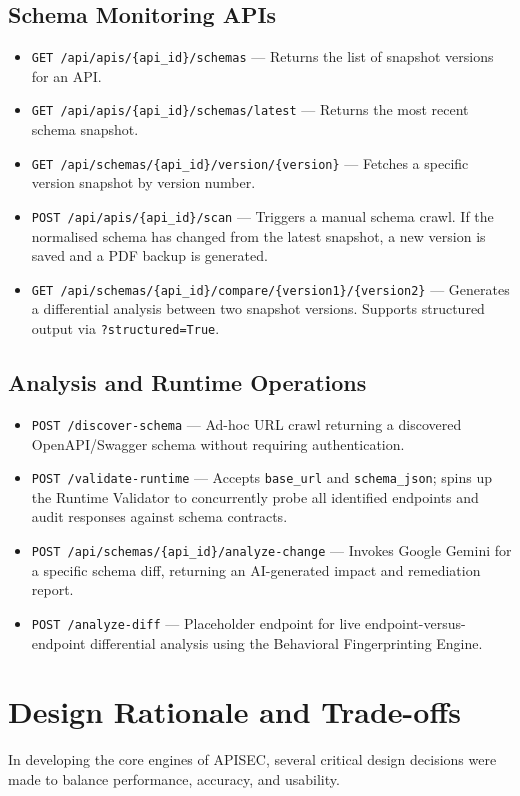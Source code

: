 \documentclass{fisatprojectfinal}
\begin{document}
\subsection{Schema Monitoring APIs}
\begin{itemize}
    \item \texttt{GET /api/apis/\{api\_id\}/schemas} --- Returns the list of snapshot versions for an API.
    \item \texttt{GET /api/apis/\{api\_id\}/schemas/latest} --- Returns the most recent schema snapshot.
    \item \texttt{GET /api/schemas/\{api\_id\}/version/\{version\}} --- Fetches a specific version snapshot by version number.
    \item \texttt{POST /api/apis/\{api\_id\}/scan} --- Triggers a manual schema crawl. If the normalised schema has changed from the latest snapshot, a new version is saved and a PDF backup is generated.
    \item \texttt{GET /api/schemas/\{api\_id\}/compare/\{version1\}/\{version2\}} --- Generates a differential analysis between two snapshot versions. Supports structured output via \texttt{?structured=True}.
\end{itemize}

\subsection{Analysis and Runtime Operations}
\begin{itemize}
    \item \texttt{POST /discover-schema} --- Ad-hoc URL crawl returning a discovered OpenAPI/Swagger schema without requiring authentication.
    \item \texttt{POST /validate-runtime} --- Accepts \texttt{base\_url} and \texttt{schema\_json}; spins up the Runtime Validator to concurrently probe all identified endpoints and audit responses against schema contracts.
    \item \texttt{POST /api/schemas/\{api\_id\}/analyze-change} --- Invokes Google Gemini for a specific schema diff, returning an AI-generated impact and remediation report.
    \item \texttt{POST /analyze-diff} --- Placeholder endpoint for live endpoint-versus-endpoint differential analysis using the Behavioral Fingerprinting Engine.
\end{itemize}

\section{Design Rationale and Trade-offs}
In developing the core engines of APISEC, several critical design decisions were made to balance performance, accuracy, and usability.
\end{document}
